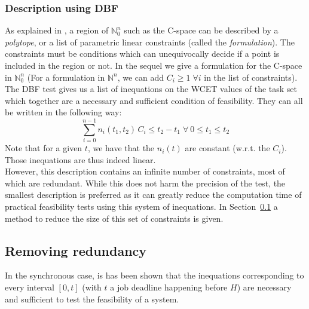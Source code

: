 \documentclass[times, 10pt,twocolumn, a4paper]{article}
\begin{document}

		\subsubsection{Description using DBF}
			\label{sct:cspaceDescr}

			As explained in \cite{nemhauser1988integer}, a region of $\mathbb{N}_0^n$ such as the C-space can be described by a \emph{polytope}, or a list of parametric linear constraints (called the \emph{formulation}). The constraints must be conditions which can unequivocally decide if a point is included in the region or not. In the sequel we give a formulation for the C-space in $\mathbb{N}_0^n$ (For a formulation in $\mathbb{N}^n$, we can add $C_i \geqslant 1 \; \forall i$ in the list of constraints).\\

			The DBF test gives us a list of inequations on the WCET values of the task set which together are a necessary and sufficient condition of feasibility. They can all be written in the following way:
			\[
				\sum_{i=0}^{n-1} n_i(t_1, t_2) \, C_i \leq t_2 - t_1 \; \forall \: 0 \leq t_1 \leq t_2
			\]
			Note that for a given $t$, we have that the $n_i(t)$ are
			constant (w.r.t. the $C_i$). Those inequations are thus indeed linear.\\

			However, this description contains an infinite number of constraints, most of
			which are redundant. While this does not harm the precision of the
			test, the smallest description is preferred as it can greatly
			reduce the computation time of practical feasibility tests using this system
			of inequations. In Section~\ref{sct:removeRedundancy} a method to reduce the size of this set of constraints is given.

	\subsection{Removing redundancy}
		\label{sct:removeRedundancy}

	In the synchronous case, is has been shown that the inequations corresponding
	to every interval $[0, t]$ (with $t$ a job deadline happening before $H$) are
	necessary and sufficient to test the feasibility of a system.\\
\end{document}
